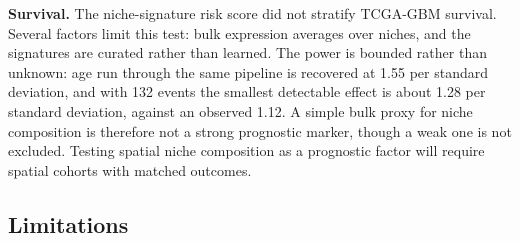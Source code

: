 \documentclass[11pt,letterpaper]{article}
\begin{document}
\textbf{Survival.} The niche-signature risk score did not stratify TCGA-GBM survival. Several factors limit this test: bulk expression averages over niches, and the signatures are curated rather than learned. The power is bounded rather than unknown: age run through the same pipeline is recovered at 1.55 per standard deviation, and with 132 events the smallest detectable effect is about 1.28 per standard deviation, against an observed 1.12. A simple bulk proxy for niche composition is therefore not a strong prognostic marker, though a weak one is not excluded. Testing spatial niche composition as a prognostic factor will require spatial cohorts with matched outcomes.

\subsection{Limitations}
\end{document}
